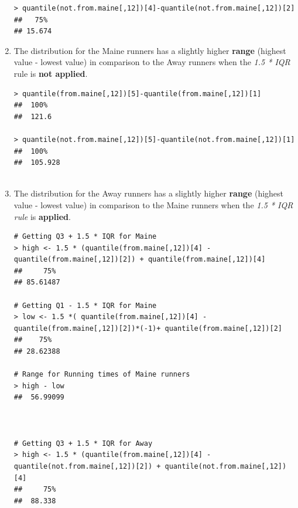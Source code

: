 \documentclass[12pt,letterpaper,titlepage,en-US]{article}
\begin{document}
\begin{enumerate}
\begin{knitrout}
\begin{kframe}
\begin{verbatim}
> quantile(not.from.maine[,12])[4]-quantile(not.from.maine[,12])[2]
##   75% 
## 15.674 

\end{verbatim}
\end{kframe}
\end{knitrout}


\item The distribution for the Maine runners has a slightly higher \textbf{range} (highest value - lowest value) in comparison to the Away runners when the \emph{1.5 * IQR} rule is \textbf{not applied}.
\begin{knitrout}
\color{fgcolor}
\begin{kframe}

\begin{verbatim}
> quantile(from.maine[,12])[5]-quantile(from.maine[,12])[1]
##  100% 
##  121.6 

> quantile(not.from.maine[,12])[5]-quantile(not.from.maine[,12])[1]
##  100% 
##  105.928 
 
\end{verbatim}
\end{kframe}
\end{knitrout}



\item The distribution for the Away runners has a slightly higher \textbf{range} (highest value - lowest value) in comparison to the Maine runners when the \emph{1.5 * IQR rule} is \textbf{applied}.

\begin{knitrout}
\color{fgcolor}
\begin{kframe}

\begin{verbatim}
# Getting Q3 + 1.5 * IQR for Maine
> high <- 1.5 * (quantile(from.maine[,12])[4] - 
quantile(from.maine[,12])[2]) + quantile(from.maine[,12])[4]
##     75% 
## 85.61487 

# Getting Q1 - 1.5 * IQR for Maine
> low <- 1.5 *( quantile(from.maine[,12])[4] - 
quantile(from.maine[,12])[2])*(-1)+ quantile(from.maine[,12])[2]
##    75% 
## 28.62388 

# Range for Running times of Maine runners
> high - low
##  56.99099



# Getting Q3 + 1.5 * IQR for Away
> high <- 1.5 * (quantile(from.maine[,12])[4] - 
quantile(not.from.maine[,12])[2]) + quantile(not.from.maine[,12])[4]
##     75% 
## 	88.338  


\end{verbatim}
\end{kframe}
\end{knitrout}
\end{enumerate}
\end{document}
